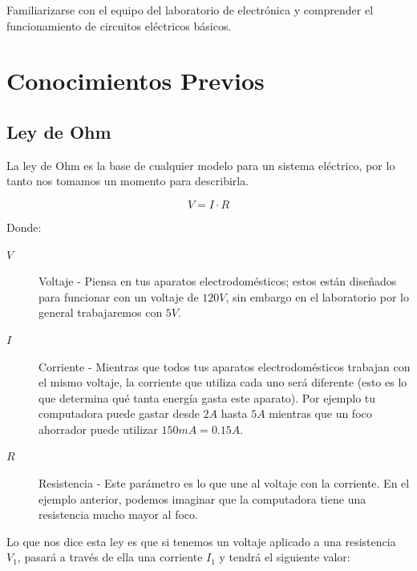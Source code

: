 	Familiarizarse con el equipo del laboratorio de electrónica y comprender el funcionamiento de circuitos eléctricos básicos.


\section{Conocimientos Previos}


	\subsection{Ley de Ohm}

		La ley de Ohm es la base de cualquier modelo para un sistema eléctrico, por lo tanto nos tomamos un momento para describirla.

		\begin{equation}
			V = I \cdot R
		\end{equation}

		Donde:

		\begin{description}
			\item[$V$] Voltaje - Piensa en tus aparatos electrodomésticos; estos están diseñados para funcionar con un voltaje de $120 V$, sin embargo en el laboratorio por lo general trabajaremos con $5 V$.
			\item[$I$] Corriente - Mientras que todos tus aparatos electrodomésticos trabajan con el mismo voltaje, la corriente que utiliza cada uno será diferente (esto es lo que determina qué tanta energía gasta este aparato). Por ejemplo tu computadora puede gastar desde $2 A$ hasta $5 A$ mientras que un foco ahorrador puede utilizar $150 mA = 0.15 A$.
			\item[$R$] Resistencia - Este parámetro es lo que une al voltaje con la corriente. En el ejemplo anterior, podemos imaginar que la computadora tiene una resistencia mucho mayor al foco.
		\end{description}

		Lo que nos dice esta ley es que si tenemos un voltaje aplicado a una resistencia $V_1$, pasará a través de ella una corriente $I_1$ y tendrá el siguiente valor:

